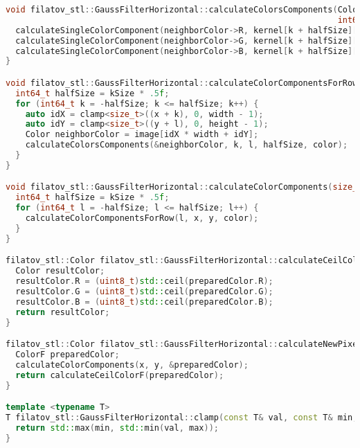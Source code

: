 \documentclass{report}
\begin{document}
\begin{lstlisting}[language=C++,caption=STL версия]
void filatov_stl::GaussFilterHorizontal::calculateColorsComponents(Color* neighborColor, int64_t k, int64_t l,
                                                                   int64_t halfSize, ColorF* color) {
  calculateSingleColorComponent(neighborColor->R, kernel[k + halfSize][l + halfSize], &color->R);
  calculateSingleColorComponent(neighborColor->G, kernel[k + halfSize][l + halfSize], &color->G);
  calculateSingleColorComponent(neighborColor->B, kernel[k + halfSize][l + halfSize], &color->B);
}

void filatov_stl::GaussFilterHorizontal::calculateColorComponentsForRow(int64_t l, size_t x, size_t y, ColorF* color) {
  int64_t halfSize = kSize * .5f;
  for (int64_t k = -halfSize; k <= halfSize; k++) {
    auto idX = clamp<size_t>((x + k), 0, width - 1);
    auto idY = clamp<size_t>((y + l), 0, height - 1);
    Color neighborColor = image[idX * width + idY];
    calculateColorsComponents(&neighborColor, k, l, halfSize, color);
  }
}

void filatov_stl::GaussFilterHorizontal::calculateColorComponents(size_t x, size_t y, ColorF* color) {
  int64_t halfSize = kSize * .5f;
  for (int64_t l = -halfSize; l <= halfSize; l++) {
    calculateColorComponentsForRow(l, x, y, color);
  }
}

filatov_stl::Color filatov_stl::GaussFilterHorizontal::calculateCeilColorF(ColorF preparedColor) {
  Color resultColor;
  resultColor.R = (uint8_t)std::ceil(preparedColor.R);
  resultColor.G = (uint8_t)std::ceil(preparedColor.G);
  resultColor.B = (uint8_t)std::ceil(preparedColor.B);
  return resultColor;
}

filatov_stl::Color filatov_stl::GaussFilterHorizontal::calculateNewPixelColor(size_t x, size_t y) {
  ColorF preparedColor;
  calculateColorComponents(x, y, &preparedColor);
  return calculateCeilColorF(preparedColor);
}

template <typename T>
T filatov_stl::GaussFilterHorizontal::clamp(const T& val, const T& min, const T& max) {
  return std::max(min, std::min(val, max));
}
\end{lstlisting}
\end{document}
